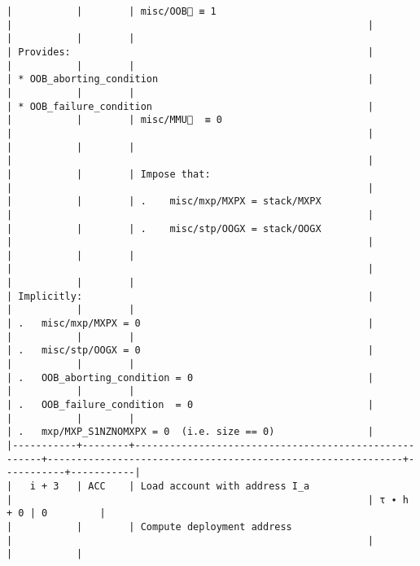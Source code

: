 \documentclass[varwidth=\maxdimen,margin=0.5cm,multi={verbatim}]{standalone}
\begin{document}
\begin{verbatim}
|           |        | misc/OOB🚩 ≡ 1                                       |                                                             |
|           |        |                                                      | Provides:                                                   |
|           |        |                                                      | * OOB_aborting_condition                                    |
|           |        |                                                      | * OOB_failure_condition                                     |
|           |        | misc/MMU🚩  ≡ 0                                      |                                                             |
|           |        |                                                      |                                                             |
|           |        | Impose that:                                         |                                                             |
|           |        | .    misc/mxp/MXPX = stack/MXPX                      |                                                             |
|           |        | .    misc/stp/OOGX = stack/OOGX                      |                                                             |
|           |        |                                                      |                                                             |
|           |        |                                                      | Implicitly:                                                 |
|           |        |                                                      | .   misc/mxp/MXPX = 0                                       |
|           |        |                                                      | .   misc/stp/OOGX = 0                                       |
|           |        |                                                      | .   OOB_aborting_condition = 0                              |
|           |        |                                                      | .   OOB_failure_condition  = 0                              |
|           |        |                                                      | .   mxp/MXP_S1NZNOMXPX = 0  (i.e. size == 0)                |
|-----------+--------+------------------------------------------------------+-------------------------------------------------------------+-----------+-----------|
|   i + 3   | ACC    | Load account with address I_a                        |                                                             | τ ∙ h + 0 | 0         |
|           |        | Compute deployment address                           |                                                             |           |           |

\end{verbatim}
\end{document}
